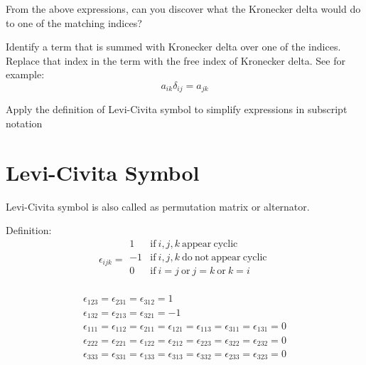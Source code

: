 \begin{question}[ID=kdelteuse1]
From the above expressions, can you discover what the Kronecker delta would do to one of the matching indices?
\end{question}
\begin{solution}[print]
Identify a term that is summed with Kronecker delta over one of the indices. Replace that index in the term with the free index of Kronecker delta. See for example:
$$ a_{ik} \delta_{ij} = a_{jk}$$
\end{solution}

\begin{lo3}[Preliminaries]
Apply the definition of Levi-Civita symbol to simplify expressions in subscript notation
\end{lo3}


\section{Levi-Civita Symbol}

Levi-Civita symbol is also called as permutation matrix or alternator.  

Definition: 
$$ \epsilon_{ijk} = 
\begin{array}{ll}
1 & \mathrm{if}\  i,j,k \  \mathrm{appear \  cyclic} \\
-1 & \mathrm{if}\  i,j,k \  \mathrm{do \ not \ appear\ cyclic} \\
0 & \mathrm{if}\ i=j \  \mathrm{or} \  j=k \ \mathrm{or} \  k=i  \\
\end{array} $$

$$ 
\begin{array}{l}
\epsilon_{123} = \epsilon_{231} = \epsilon_{312} = 1 \\
\epsilon_{132} = \epsilon_{213} = \epsilon_{321} = -1 \\
\epsilon_{111} = \epsilon_{112} = \epsilon_{211} =\epsilon_{121} = \epsilon_{113} = \epsilon_{311} =\epsilon_{131} = 0 \\
\epsilon_{222} = \epsilon_{221} = \epsilon_{122} =\epsilon_{212} = \epsilon_{223} = \epsilon_{322} =\epsilon_{232} = 0 \\
\epsilon_{333} = \epsilon_{331} = \epsilon_{133} =\epsilon_{313} = \epsilon_{332} = \epsilon_{233} = \epsilon_{323} = 0 \\
\end{array}
$$

